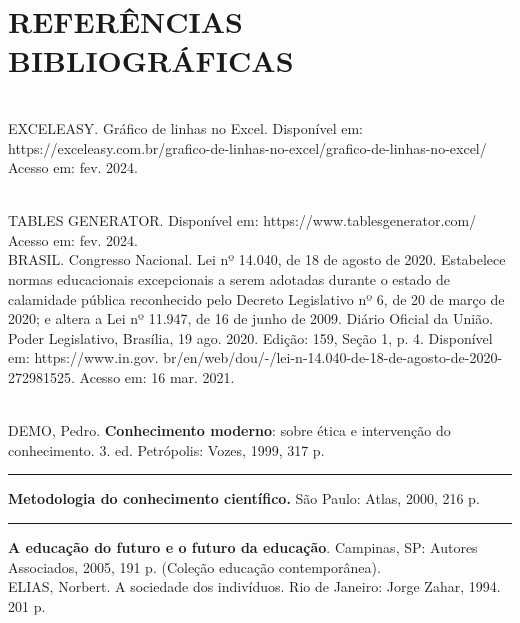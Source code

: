 \section*{REFERÊNCIAS BIBLIOGRÁFICAS}


\\

\singlespacing 
\noindent EXCELEASY. Gráfico de linhas no Excel. Disponível em: https://exceleasy.com.br/grafico-de-linhas-no-excel/grafico-de-linhas-no-excel/ Acesso em: fev. 2024.

\\

\singlespacing
\noindent TABLES GENERATOR. Disponível em: https://www.tablesgenerator.com/ Acesso em: fev. 2024.
\\

\noindent BRASIL. Congresso Nacional. Lei nº 14.040, de 18 de agosto de 2020. Estabelece normas educacionais excepcionais a serem adotadas durante o estado de calamidade pública reconhecido pelo Decreto Legislativo nº 6, de 20 de março de 2020; e altera a Lei nº 11.947, de 16 de junho de 2009. Diário Oficial da União. Poder Legislativo, Brasília, 19 ago. 2020. Edição: 159, Seção 1, p. 4. Disponível em: https://www.in.gov. br/en/web/dou/-/lei-n-14.040-de-18-de-agosto-de-2020-272981525. Acesso em: 16 mar. 2021.

\\

\singlespacing
\noindent DEMO, Pedro. \textbf{Conhecimento moderno}: sobre ética e intervenção do conhecimento. 3. ed. Petrópolis: Vozes, 1999, 317 p. 
\\

\singlespacing
\noindent \rule{2cm}{0.10mm}\textbf{ Metodologia do conhecimento científico.} São Paulo: Atlas, 2000, 216 p.
\\

\singlespacing
\noindent \rule{2cm}{0.10mm} \textbf{A educação do futuro e o futuro da educação}. Campinas, SP: Autores Associados, 2005, 191 p. (Coleção educação contemporânea). 
\\

\singlespacing
\noindent ELIAS, Norbert. A sociedade dos indivíduos. Rio de Janeiro: Jorge Zahar, 1994. 201 p. 
\\

